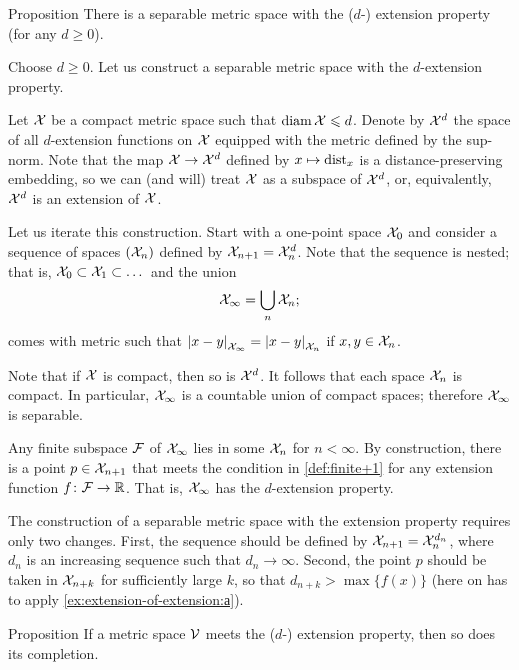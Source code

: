 \begin{thm}{Proposition}\label{prop:univeral-separable}
There is a separable metric space with the ($d$-) extension property (for any $d\ge 0$).
\end{thm}

Choose $d\ge 0$.
Let us construct a separable metric space with  the $d$-extension property.

Let $\mathcal{X}$ be a compact metric space such that $\operatorname{\rm diam}\nolimits\mathcal{X}\leqslant d$.
Denote by $\mathcal{X}^d$ the space of all $d$-extension functions on $\mathcal{X}$ equipped with the metric defined by the sup-norm.
Note that the map $\mathcal{X} \to \mathcal{X}^d$ defined by $x\mapsto\mathrm{dist}_x$ is a distance-preserving embedding,
so we can (and will) treat $\mathcal{X}$ as a subspace of $\mathcal{X}^d$, or, equivalently, $\mathcal{X}^d$ is an extension of $\mathcal{X}$.

Let us iterate this construction.
Start with a one-point space $\mathcal{X}_0$ and consider a sequence of spaces $(\mathcal{X}_n)$ defined by $\spc{X}_{n+1}\z=\spc{X}_n^d$.
Note that the sequence is nested;
that is, $\mathcal{X}_0\subset \mathcal{X}_1\subset\dots$
and the union
\[\mathcal{X}_\infty=\bigcup_n\mathcal{X}_n;\]
comes with metric such that
$\dist{x}{y}{\spc{X}_\infty} = \dist{x}{y}{\spc{X}_n}$
if $x,y\in\mathcal{X}_n$.

Note that if $\mathcal{X}$ is compact, then so is $\mathcal{X}^d$.
It follows that each space $\mathcal{X}_n$ is compact.
In particular, $\mathcal{X}_\infty$ is a countable union of compact spaces;
therefore $\mathcal{X}_\infty$ is separable.

Any finite subspace $\mathcal{F}$ of $\mathcal{X}_\infty$ lies in some $\mathcal{X}_n$ for $n<\infty$.
By construction, there is a point $p\in \mathcal{X}_{n+1}$ that meets the condition in \ref{def:finite+1} for any extension function $f\colon\mathcal{F}\to\mathbb{R}$.
That is, $\mathcal{X}_\infty$ has the $d$-extension property.

The construction of a separable metric space with the extension property requires only two changes.
First, the sequence should be defined by $\spc{X}_{n+1}\z=\spc{X}_n^{d_n}$, where $d_n$ is an increasing sequence such that $d_n\to\infty$.
Second, the point $p$ should be taken in $\mathcal{X}_{n+k}$ for sufficiently large $k$, so that $d_{n+k}>\max\{f(x)\}$
(here on has to apply \ref{ex:extension-of-extension:а}).
\qeds

\begin{thm}{Proposition}\label{prop:completion-univeral}
If a metric space $\mathcal{V}$ meets the ($d$-) extension property, then so does its completion.
\end{thm}

